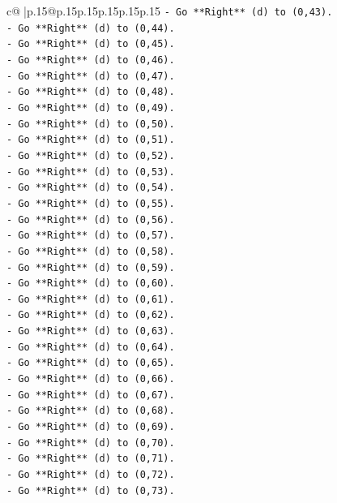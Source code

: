 \documentclass{article}
\begin{document}
{\begin{supertabular}{c@{$\;$}|p{.15\linewidth}@{}p{.15\linewidth}p{.15\linewidth}p{.15\linewidth}p{.15\linewidth}p{.15\linewidth}}
{{{\texttt{{-} Go **Right** (d) to (0,43).} \\
\texttt{{-} Go **Right** (d) to (0,44).} \\
\texttt{{-} Go **Right** (d) to (0,45).} \\
\texttt{{-} Go **Right** (d) to (0,46).} \\
\texttt{{-} Go **Right** (d) to (0,47).} \\
\texttt{{-} Go **Right** (d) to (0,48).} \\
\texttt{{-} Go **Right** (d) to (0,49).} \\
\texttt{{-} Go **Right** (d) to (0,50).} \\
\texttt{{-} Go **Right** (d) to (0,51).} \\
\texttt{{-} Go **Right** (d) to (0,52).} \\
\texttt{{-} Go **Right** (d) to (0,53).} \\
\texttt{{-} Go **Right** (d) to (0,54).} \\
\texttt{{-} Go **Right** (d) to (0,55).} \\
\texttt{{-} Go **Right** (d) to (0,56).} \\
\texttt{{-} Go **Right** (d) to (0,57).} \\
\texttt{{-} Go **Right** (d) to (0,58).} \\
\texttt{{-} Go **Right** (d) to (0,59).} \\
\texttt{{-} Go **Right** (d) to (0,60).} \\
\texttt{{-} Go **Right** (d) to (0,61).} \\
\texttt{{-} Go **Right** (d) to (0,62).} \\
\texttt{{-} Go **Right** (d) to (0,63).} \\
\texttt{{-} Go **Right** (d) to (0,64).} \\
\texttt{{-} Go **Right** (d) to (0,65).} \\
\texttt{{-} Go **Right** (d) to (0,66).} \\
\texttt{{-} Go **Right** (d) to (0,67).} \\
\texttt{{-} Go **Right** (d) to (0,68).} \\
\texttt{{-} Go **Right** (d) to (0,69).} \\
\texttt{{-} Go **Right** (d) to (0,70).} \\
\texttt{{-} Go **Right** (d) to (0,71).} \\
\texttt{{-} Go **Right** (d) to (0,72).} \\
\texttt{{-} Go **Right** (d) to (0,73).} \\
}}}
\end{supertabular}}
\end{document}
